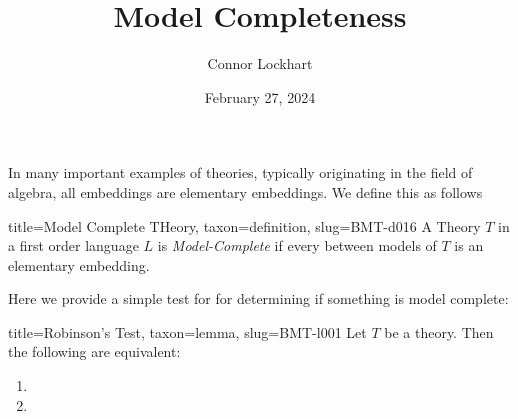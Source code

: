 \documentclass[a4paper]{article}
\title{Model Completeness}
\date{February 27, 2024}
\author{Connor Lockhart}
\begin{document}
\maketitle
\par{In many important examples of theories, typically originating in the field of algebra, all embeddings are elementary embeddings. We define this as follows}
\begin{tree}{title={Model Complete THeory}, taxon={definition}, slug={BMT-d016}}
A Theory \(T\) in a first order language \(L\) is \emph{Model-Complete} if  every  between models of \(T\) is an elementary embedding. 
\end{tree}
\par{Here we provide a simple test for for determining if something is model complete:}
\begin{tree}{title={Robinson's Test}, taxon={lemma}, slug={BMT-l001}}
 Let \(T\) be a theory. Then the following are equivalent:\begin{enumerate}
\item{}
    \item{}
\end{enumerate}
\end{tree}

\printbibliography
\end{document}
